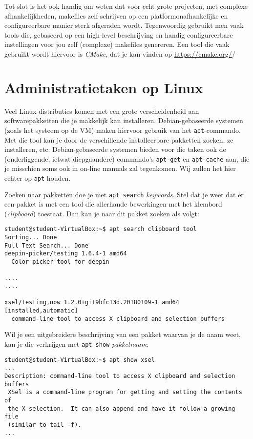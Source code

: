 \documentclass[a4paper,twoside,openany]{memoir}
\begin{document}
Tot slot is het ook handig om weten dat voor echt grote projecten, met complexe
afhankelijkheden, makefiles zelf schrijven op een platformonafhankelijke en
configureerbare manier sterk afgeraden wordt. Tegenwoordig gebruikt men vaak
tools die, gebaseerd op een high-level beschrijving en handig configureerbare
instellingen voor jou zelf (complexe) makefiles genereren. Een tool die vaak
gebruikt wordt hiervoor is \emph{CMake}, dat je kan vinden op
\url{https://cmake.org/}/

\chapter{Administratietaken op Linux}

Veel Linux-distributies komen met een grote verscheidenheid aan
softwarepakketten die je makkelijk kan installeren. Debian-gebaseerde systemen
(zoals het systeem op de VM) maken hiervoor gebruik van het \verb!apt!-commando.
Met die tool kan je door de verschillende installeerbare pakketten zoeken, ze
installeren, etc. Debian-gebaseerde systemen bieden voor die taken ook de
(onderliggende, ietwat diepgaandere) commando's \verb!apt-get! en
\verb!apt-cache! aan, die je misschien soms ook in on-line manuals zal
tegenkomen. Wij zullen het hier echter op \verb!apt! houden.

Zoeken naar pakketten doe je met \verb!apt search! \emph{keywords}. Stel dat je
weet dat er een pakket is met een tool die allerhande bewerkingen met het
klembord (\emph{clipboard}) toestaat. Dan kan je naar dit pakket zoeken als
volgt:
\begin{verbatim}
student@student-VirtualBox:~$ apt search clipboard tool
Sorting... Done
Full Text Search... Done
deepin-picker/testing 1.6.4-1 amd64
  Color picker tool for deepin

....
....

xsel/testing,now 1.2.0+git9bfc13d.20180109-1 amd64 [installed,automatic]
  command-line tool to access X clipboard and selection buffers
\end{verbatim}

Wil je een uitgebreidere beschrijving van een pakket waarvan je de naam weet,
kan je die verkrijgen met \verb!apt show! \emph{pakketnaam}:

\begin{verbatim}
student@student-VirtualBox:~$ apt show xsel
...
Description: command-line tool to access X clipboard and selection buffers
 XSel is a command-line program for getting and setting the contents of
 the X selection.  It can also append and have it follow a growing file
 (similar to tail -f).
...
\end{verbatim}
\end{document}
